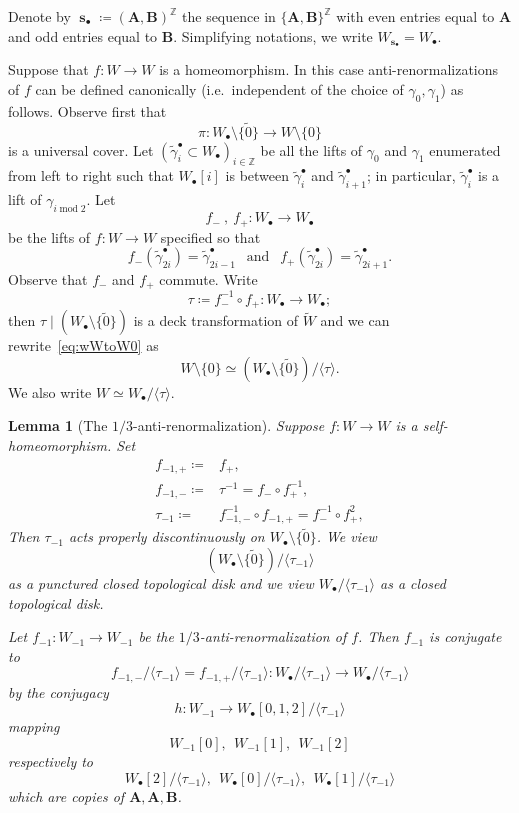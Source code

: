 \documentclass[]{amsart}
\renewcommand{\sp}{{\ \ }}
\newcommand\seqo{{\operatorname{\mathbf s}_{\bullet}}}
\newcommand\oseq{{\bullet}}
\newcommand{\A}{\mathbf A}
\newcommand{\B}{\mathbf B}
\newcommand\wgamma{{\widetilde \gamma}}
\newcommand{\Z}{\mathbb{Z}}
\newtheorem{lem}[thm]{Lemma}
\theoremstyle{remark}
\numberwithin{equation}{section}
\theoremstyle{definition}
\renewcommand{\mod}{\operatorname{mod}}
\begin{document}
Denote by $\seqo\coloneqq (\A,\B)^{\Z}$ the sequence in $\{\A,\B\}^{\Z}$ with even entries equal to $\A$ and odd entries equal to $\B$. Simplifying notations, we write $W_{\seqo}=W_{\oseq}$.

Suppose that $f\colon W\to W$ is a homeomorphism. In this case anti-renormalizations of $f$ can be defined canonically (i.e.~independent of the choice of $\gamma_0,\gamma_1$) as follows. Observe first that
\begin{equation}
\label{eq:wWtoW0}
\pi\colon W_{\oseq}\setminus \{\widetilde 0\} \to W\setminus \{0\}
\end{equation}
is a universal cover. Let $( \wgamma_i^\oseq \subset W_\oseq)_{i\in \Z}$ be all the lifts of $\gamma_0$ and $\gamma_1$ enumerated from left to right such that $W_\oseq[i]$ is between $\wgamma_{i}^\oseq$ and $\wgamma_{i+1}^\oseq$; in particular, $\wgamma_i^\oseq$ is a lift of $\gamma_{i \mod 2}$. Let \[f_-\ ,\   f_+ \colon  W_\oseq \to  W_\oseq\] 
 be the lifts of $f\colon  W \to  W$ specified so that \[f_-(\wgamma_{2 i}^\oseq)=\wgamma_{2 i-1}^\oseq\sp \text{ and }\sp f_+(\wgamma_{2 i}^\oseq)=\wgamma_{2 i+ 1}^\oseq. \]
Observe that $f_-$ and $f_+$ commute. Write 
\[\tau \coloneqq f_-^{-1}\circ f_+ \colon  W_\oseq \to  W_\oseq; \]then $\tau\mid (W_{\oseq}\setminus \{\widetilde 0\})$ is a deck transformation of $\widetilde W$ and we can rewrite~\eqref{eq:wWtoW0} as \[W\setminus \{0\} \simeq \left(W_{\oseq}\setminus \{\widetilde 0\}\right)/  \langle \tau \rangle.\] We also write $W \simeq W_\oseq/  \langle \tau \rangle$.




\begin{lem}[The $1/3$-anti-renormalization]
\label{lem:1 3 AntiRen}
Suppose $f\colon W\to W$ is a self-homeomorphism. Set
\begin{align*}
f_{-1,+}\coloneqq& f_+, \\
f_{-1,-}\coloneqq&\tau^{-1}=f_{-}\circ f_+^{-1},\\
\tau_{-1}\coloneqq&f_{-1,-}^{-1}\circ f_{-1,+}= f^{-1}_{-}\circ f_+^2,
\end{align*}
Then  $\tau_{-1}$ acts properly discontinuously on $W_{\oseq}\setminus \{\widetilde 0\}$. We view \[\left(W_{\oseq}\setminus \{\widetilde 0\}\right)/\langle\tau_{-1} \rangle\] as a punctured closed topological disk and we view $ W_\oseq /\langle \tau_{-1} \rangle$ as a closed topological disk.


Let $f_{-1}\colon W_{-1}\to W_{-1}$ be the $1/3$-anti-renormalization of $f$. Then $f_{-1}$ is  conjugate to 
 \[ f_{-1,-}^{}/\langle \tau_{-1} \rangle = f_{-1,+}/\langle \tau_{-1} \rangle\colon W_\oseq /\langle \tau_{-1} \rangle\to W_\oseq /\langle \tau_{-1} \rangle  \]
 by the conjugacy \[h\colon W_{-1}\to W_\oseq [0,1,2]/\langle\tau_{-1}\rangle \] mapping 
 \[W_{-1}[0],\sp W_{-1}[1],\sp  W_{-1}[2]\]
respectively to  \[ {W_\oseq [2]/\langle \tau_{-1}\rangle},  \sp {W_\oseq[0]/\langle \tau_{-1}\rangle}, \sp{W_\oseq[1]/\langle \tau_{-1}\rangle}\]  which are copies of $\A,\A,\B$.
\end{lem}
\end{document}
